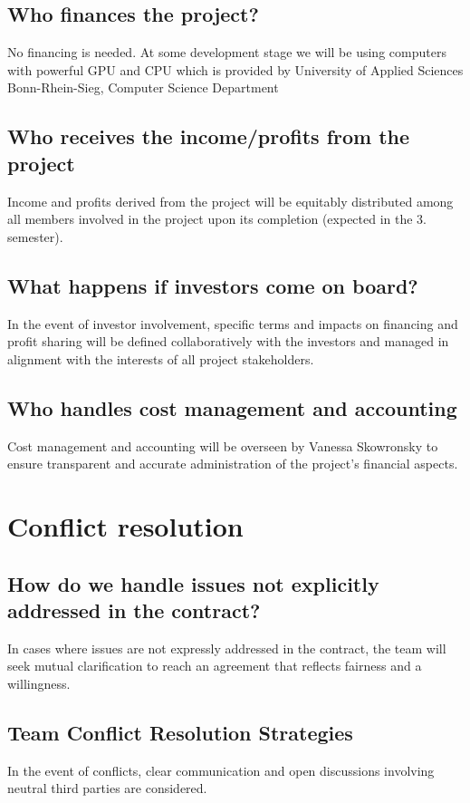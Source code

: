 \documentclass{article}
\begin{document}
\subsection{Who finances the project?}
No financing is needed.
At some development stage we will be using computers with powerful GPU and CPU which is provided by University of Applied Sciences Bonn-Rhein-Sieg, Computer Science Department
\subsection{Who receives the income/profits from the project}
Income and profits derived from the project will be equitably distributed among all members involved in the project upon its completion (expected in the 3. semester).
\subsection{What happens if investors come on board?}
In the event of investor involvement, specific terms and impacts on financing and profit sharing will be defined collaboratively with the investors and managed in alignment with the interests of all project stakeholders.
\subsection{Who handles cost management and accounting}
Cost management and accounting will be overseen by Vanessa Skowronsky to ensure transparent and accurate administration of the project's financial aspects.

\section{Conflict resolution}
\subsection{How do we handle issues not explicitly addressed in the contract?}
In cases where issues are not expressly addressed in the contract, the team will seek mutual clarification to reach an agreement that reflects fairness and a willingness.

\subsection{Team Conflict Resolution Strategies}
In the event of conflicts, clear communication and open discussions involving neutral third parties are considered.
\end{document}
